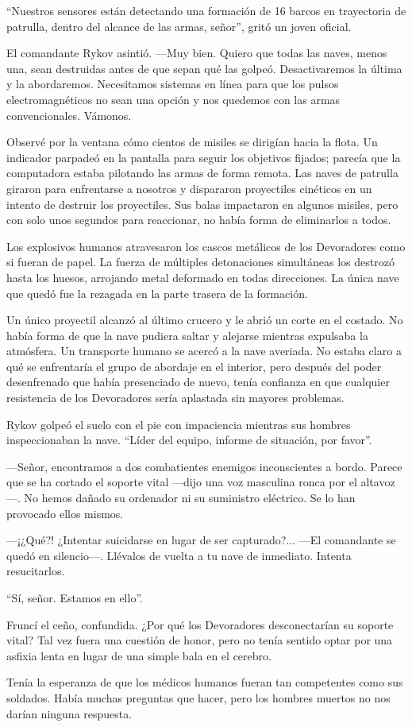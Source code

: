 “Nuestros sensores están detectando una formación de 16 barcos en trayectoria de patrulla, dentro del alcance de las armas, señor”, gritó un joven oficial.

El comandante Rykov asintió. —Muy bien. Quiero que todas las naves, menos una, sean destruidas antes de que sepan qué las golpeó. Desactivaremos la última y la abordaremos. Necesitamos sistemas en línea para que los pulsos electromagnéticos no sean una opción y nos quedemos con las armas convencionales. Vámonos.

Observé por la ventana cómo cientos de misiles se dirigían hacia la flota. Un indicador parpadeó en la pantalla para seguir los objetivos fijados; parecía que la computadora estaba pilotando las armas de forma remota. Las naves de patrulla giraron para enfrentarse a nosotros y dispararon proyectiles cinéticos en un intento de destruir los proyectiles. Sus balas impactaron en algunos misiles, pero con solo unos segundos para reaccionar, no había forma de eliminarlos a todos.

Los explosivos humanos atravesaron los cascos metálicos de los Devoradores como si fueran de papel. La fuerza de múltiples detonaciones simultáneas los destrozó hasta los huesos, arrojando metal deformado en todas direcciones. La única nave que quedó fue la rezagada en la parte trasera de la formación.

Un único proyectil alcanzó al último crucero y le abrió un corte en el costado. No había forma de que la nave pudiera saltar y alejarse mientras expulsaba la atmósfera. Un transporte humano se acercó a la nave averiada. No estaba claro a qué se enfrentaría el grupo de abordaje en el interior, pero después del poder desenfrenado que había presenciado de nuevo, tenía confianza en que cualquier resistencia de los Devoradores sería aplastada sin mayores problemas.

Rykov golpeó el suelo con el pie con impaciencia mientras sus hombres inspeccionaban la nave. “Líder del equipo, informe de situación, por favor”.

—Señor, encontramos a dos combatientes enemigos inconscientes a bordo. Parece que se ha cortado el soporte vital —dijo una voz masculina ronca por el altavoz—. No hemos dañado su ordenador ni su suministro eléctrico. Se lo han provocado ellos mismos.

—¡¿Qué?! ¿Intentar suicidarse en lugar de ser capturado?... —El comandante se quedó en silencio—. Llévalos de vuelta a tu nave de inmediato. Intenta resucitarlos.

“Sí, señor. Estamos en ello”.

Fruncí el ceño, confundida. ¿Por qué los Devoradores desconectarían su soporte vital? Tal vez fuera una cuestión de honor, pero no tenía sentido optar por una asfixia lenta en lugar de una simple bala en el cerebro.

Tenía la esperanza de que los médicos humanos fueran tan competentes como sus soldados. Había muchas preguntas que hacer, pero los hombres muertos no nos darían ninguna respuesta.